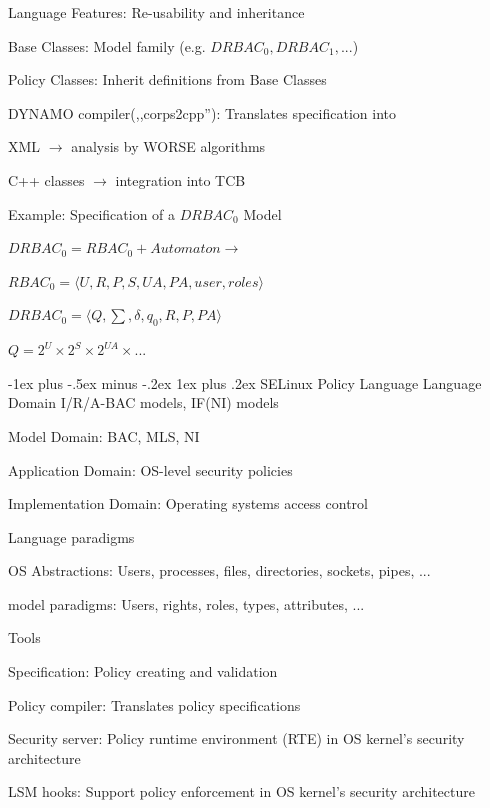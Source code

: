 \documentclass[a4paper]{article}
\makeatletter
\renewcommand{\subsubsection}{\@startsection{subsubsection}{3}{0mm}%
                {-1ex plus -.5ex minus -.2ex}%
                {1ex plus .2ex}%
                {\normalfont\small\bfseries}}
\makeatother
\begin{document}
\begin{multicols}{3}
    Language Features: Re-usability and inheritance
    \begin{itemize*}
        \item Base Classes: Model family (e.g. $DRBAC_0 , DRBAC_1 , ...$)
        \item Policy Classes: Inherit definitions from Base Classes
    \end{itemize*}

    DYNAMO compiler(,,corps2cpp''): Translates specification into
    \begin{itemize*}
        \item XML $\rightarrow$ analysis by WORSE algorithms
        \item C++ classes $\rightarrow$ integration into TCB
    \end{itemize*}

    Example: Specification of a $DRBAC_0$ Model
    \begin{itemize*}
        \item $DRBAC_0 = RBAC_0 + Automaton \rightarrow$
        \item $RBAC_0 = ⟨ U , R , P , S , UA , PA , user , roles ⟩$
        \item $DRBAC_0 = ⟨ Q , \sum, \delta, q_0 , R , P , PA ⟩$
        \item $Q = 2^U \times 2^S \times 2^{UA}\times ...$
    \end{itemize*}

    \subsubsection{SELinux Policy Language}
    Language Domain I/R/A-BAC models, IF(NI) models

    Model Domain: BAC, MLS, NI

    Application Domain: OS-level security policies

    Implementation Domain: Operating systems access control

    Language paradigms
    \begin{itemize*}
        \item OS Abstractions: Users, processes, files, directories, sockets, pipes, ...
        \item model paradigms: Users, rights, roles, types, attributes, ...
    \end{itemize*}

    Tools
    \begin{itemize*}
        \item Specification: Policy creating and validation
        \item Policy compiler: Translates policy specifications
        \item Security server: Policy runtime environment (RTE) in OS kernel’s security architecture
        \item LSM hooks: Support policy enforcement in OS kernel’s security architecture
    \end{itemize*}


\end{multicols}
\end{document}
